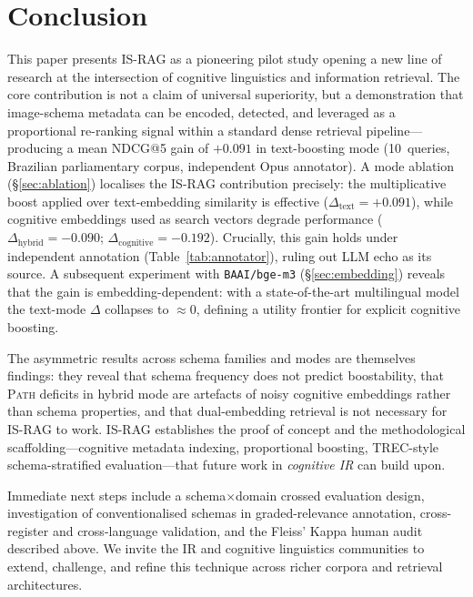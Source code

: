 \documentclass[11pt,a4paper]{article}
\begin{document}
\section{Conclusion}
\label{sec:conclusion}

This paper presents IS-RAG as a pioneering pilot study opening a new
line of research at the intersection of cognitive linguistics and
information retrieval.
The core contribution is not a claim of universal superiority, but a
demonstration that image-schema metadata can be encoded, detected, and
leveraged as a proportional re-ranking signal within a standard dense
retrieval pipeline---producing a mean NDCG@5 gain of $+0.091$ in
text-boosting mode (10~queries, Brazilian parliamentary corpus,
independent Opus annotator).
A mode ablation (\S\ref{sec:ablation}) localises the IS-RAG
contribution precisely: the multiplicative boost applied over
text-embedding similarity is effective
($\Delta_\text{text} = +0.091$), while cognitive embeddings used as
search vectors degrade performance
($\Delta_\text{hybrid} = -0.090$; $\Delta_\text{cognitive} = -0.192$).
Crucially, this gain holds under independent annotation
(Table~\ref{tab:annotator}), ruling out LLM echo as its source.
A subsequent experiment with \texttt{BAAI/bge-m3}
(\S\ref{sec:embedding}) reveals that the gain is embedding-dependent:
with a state-of-the-art multilingual model the text-mode $\Delta$
collapses to $\approx 0$, defining a utility frontier for explicit
cognitive boosting.

The asymmetric results across schema families and modes are themselves
findings: they reveal that schema frequency does not predict
boostability, that \textsc{Path} deficits in hybrid mode are artefacts
of noisy cognitive embeddings rather than schema properties, and that
dual-embedding retrieval is not necessary for IS-RAG to work.
IS-RAG establishes the proof of concept and the methodological
scaffolding---cognitive metadata indexing, proportional boosting,
TREC-style schema-stratified evaluation---that future work in
\emph{cognitive IR} can build upon.

Immediate next steps include a schema$\times$domain crossed evaluation
design, investigation of conventionalised schemas in graded-relevance
annotation, cross-register and cross-language validation, and the
Fleiss' Kappa human audit described above.
We invite the IR and cognitive linguistics communities to extend,
challenge, and refine this technique across richer corpora and
retrieval architectures.
\end{document}
